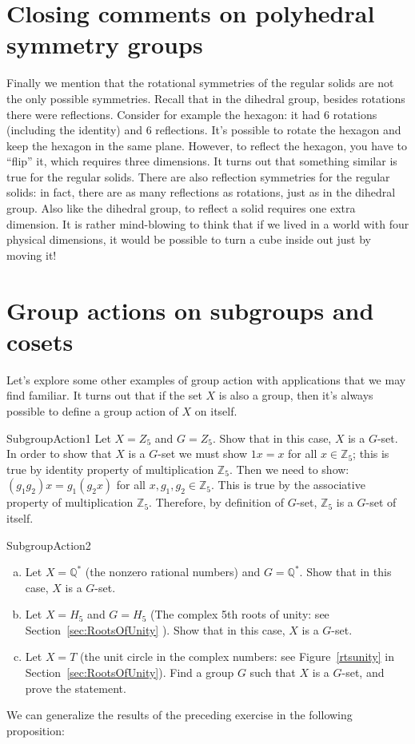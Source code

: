 \section{Closing comments on polyhedral symmetry groups}
Finally we mention that the rotational symmetries of the regular solids are not the only possible symmetries. Recall that in the dihedral group, besides rotations there were reflections. Consider for example the hexagon: it had 6 rotations (including the identity) and 6 reflections. It's possible to rotate the hexagon and keep the hexagon in the same plane. However, to reflect the hexagon, you have to ``flip'' it, which requires three dimensions.  It turns out that something similar is true for the regular solids. There are also reflection symmetries for the regular solids: in fact, there are as many reflections as rotations, just as in the dihedral group. Also like the dihedral group, to reflect a solid requires one extra dimension. It is rather mind-blowing to think that if we lived in a world with four physical dimensions, it would be possible to turn a cube inside out just by moving it!
\section{Group actions on subgroups and cosets}\label{SubgroupsAndCosets}
Let's explore some other examples of group action with applications that we may find familiar.   It turns out that if the set $X$ is also a group, then it's always possible to define a group action of $X$ on itself.

\begin{example}{SubgroupAction1}
Let $X= Z_5$  and $G = Z_5$. Show that in this case, $X$ is a $G$-set.
In order to show that $X$ is a $G$-set we must show $1x = x$ for all $x \in\mathbb {Z}_5$; this is true by identity property of multiplication $\mathbb{Z}_5$.  Then we need to show: $(g_1g_2)x = g_1(g_2x)$ for all $x, g_1,g_2 \in\mathbb{ Z}_5$. This is true by the associative property of multiplication $\mathbb {Z}_5$.  Therefore, by definition of $G$-set, $\mathbb{Z}_5$ is a $G$-set of itself.
\end {example}

\begin {exercise}{SubgroupAction2}
\begin {enumerate} [(a)]
\item Let $X =\mathbb{ Q}^* $ (the nonzero rational numbers) and $G = \mathbb{Q}^*$. Show that in this case, $X$ is a $G$-set.

\item Let $X = H_5$ and $G = H_5$ (The complex 5th roots of unity:  see Section~\ref{sec:RootsOfUnity}  ). Show that in this case, $X$ is a $G$-set.
\item Let $X = T$ (the unit circle in the complex numbers:  see Figure~\ref{rtsunity} in Section~\ref{sec:RootsOfUnity}).  Find a group $G$ such that $X$ is a $G$-set, and prove the statement.
\end{enumerate}
\end {exercise}
We can generalize the results of the preceding exercise in the following proposition:

